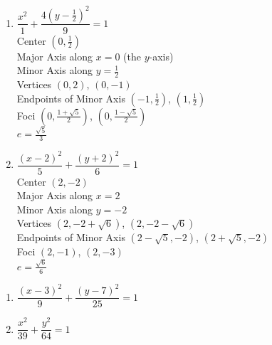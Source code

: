 \begin{multicols}{2}
\begin{enumerate}
\setcounter{enumi}{\value{HW}}

\item  $\dfrac{x^2}{1} + \dfrac{4\left(y-\frac{1}{2}\right)^2}{9} = 1$\\
Center  $\left(0, \frac{1}{2} \right)$\\
Major Axis along $x=0$ (the $y$-axis)\\
Minor Axis along $y=\frac{1}{2}$\\
Vertices  $\left( 0, 2   \right)$, $(0, -1)$\\
Endpoints of Minor Axis $\left(-1, \frac{1}{2} \right)$, $\left(1, \frac{1}{2} \right)$\\
Foci $\left(0, \frac{1+\sqrt{5}}{2}\right)$, $\left(0, \frac{1-\sqrt{5}}{2}\right)$\\
$e = \frac{\sqrt{5}}{3}$

\vfill

\columnbreak


\item  $\dfrac{(x-2)^2}{5} + \dfrac{\left(y+2\right)^2}{6} = 1$\\
Center  $\left(2, -2 \right)$\\
Major Axis along $x=2$\\
Minor Axis along $y=-2$\\
Vertices  $\left( 2, -2+\sqrt{6}   \right)$, $(2, -2-\sqrt{6})$\\
Endpoints of Minor Axis $\left(2-\sqrt{5},-2 \right)$, $\left(2+\sqrt{5},-2\right)$\\
Foci $\left(2,-1 \right)$, $\left(2, -3\right)$\\
$e = \frac{\sqrt{6}}{6}$



\setcounter{HW}{\value{enumi}}
\end{enumerate}
\end{multicols}

\begin{multicols}{2}
\begin{enumerate}
\setcounter{enumi}{\value{HW}}

\item $\dfrac{(x - 3)^{2}}{9} + \dfrac{(y - 7)^{2}}{25} = 1$
\item $\dfrac{x^{2}}{39} + \dfrac{y^{2}}{64} = 1$


\setcounter{HW}{\value{enumi}}
\end{enumerate}
\end{multicols}


